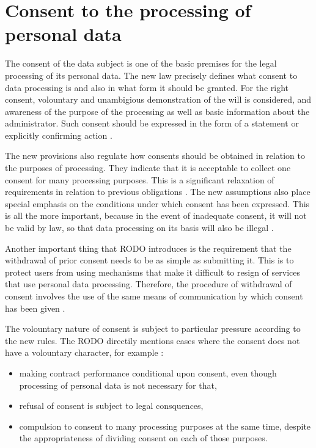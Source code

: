 \documentclass[en, noamssymb]{mgr}
\begin{document}
\section{Consent to the processing of personal data}

The consent of the data subject is one of the basic premises for the legal processing of its personal data. The new law precisely defines what consent to data processing is and also in what form it should be granted. For the right consent, volountary and unambigious demonstration of the will is considered, and awareness of the purpose of the processing as well as basic information about the administrator. Such consent should be expressed in the form of a statement or explicitly confirming action \cite{blog_zgoda}.

\indent The new provisions also regulate how consents should be obtained in relation to the purposes of processing. They indicate that it is acceptable to collect one consent for many processing purposes. This is a significant relaxation of requirements in relation to previous obligations \cite{blog_zgoda}. The new assumptions also place special emphasis on the conditions under which consent has been expressed. This is all the more important, because in the event of inadequate consent, it will not be valid by law, so that data processing on its basis will also be illegal \cite{blog_zgoda}.

\indent Another important thing that RODO introduces is the requirement that the withdrawal of prior consent needs to be as simple as submitting it. This is to protect users from using mechanisms that make it difficult to resign of services that use personal data processing. Therefore, the procedure of withdrawal of consent involves the use of the same means of communication by which consent has been given \cite{blog_zgoda}. 

\indent The volountary nature of consent is subject to particular pressure according to the new rules. The RODO directily mentions cases where the consent does not have a volountary character, for example \cite{blog_zgoda}:

\begin{itemize}

\item making contract performance conditional upon consent, even though processing of personal data is not necessary for that,

\item refusal of consent is subject to legal consquences,

\item compulsion to consent to many processing purposes at the same time, despite the appropriateness of dividing consent on each of those purposes.

\end{itemize}
\end{document}
